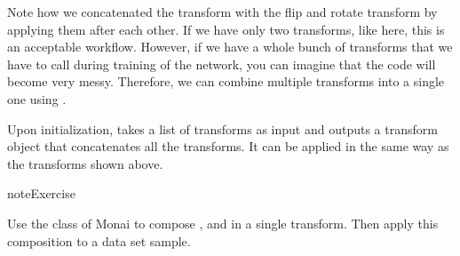 \documentclass[letterpaper,10pt,english]{jupyterBook}
\begin{document}
\sphinxAtStartPar
Note how we concatenated the  transform with the flip and rotate transform by applying them after each other. If we have only two transforms, like here, this is an acceptable workflow. However, if we have a whole bunch of transforms that we have to call during training of the network, you can imagine that the code will become very messy. Therefore, we can combine multiple transforms into a single one using .

\sphinxAtStartPar
Upon initialization,  takes a list of transforms as input and outputs a transform object that concatenates all the transforms. It can be applied in the same way as the transforms shown above.

\begin{sphinxadmonition}{note}{Exercise}

\sphinxAtStartPar
Use the  class of Monai to compose ,  and  in a single transform. Then apply this composition to a data set sample.
\end{sphinxadmonition}
\end{document}

